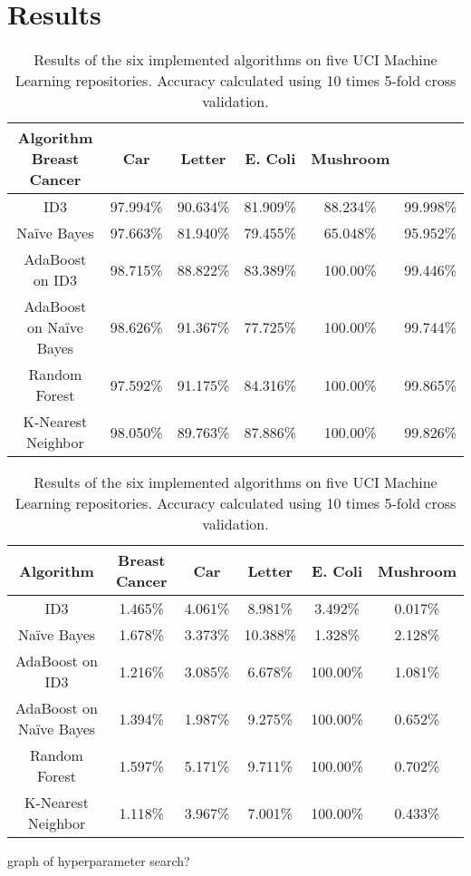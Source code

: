 \documentclass[11pt]{article}
\begin{document}
\section{Results}
\begin{table}
  \begin{tabular}{ |c|c|c|c|c|c| }
    \hline
    Algorithm               Breast Cancer   & Car      & Letter   & E. Coli  & Mushroom \\ \hline
    ID3                     & 97.994\%      & 90.634\% & 81.909\% & 88.234\% & 99.998\% \\ \hline
    Naïve Bayes             & 97.663\%      & 81.940\% & 79.455\% & 65.048\% & 95.952\% \\ \hline
    AdaBoost on ID3         & 98.715\%      & 88.822\% & 83.389\% & 100.00\% & 99.446\% \\ \hline
    AdaBoost on Naïve Bayes & 98.626\%      & 91.367\% & 77.725\% & 100.00\% & 99.744\% \\ \hline
    Random Forest           & 97.592\%      & 91.175\% & 84.316\% & 100.00\% & 99.865\% \\ \hline
    K-Nearest Neighbor      & 98.050\%      & 89.763\% & 87.886\% & 100.00\% & 99.826\% \\ \hline
  \end{tabular}
  \caption{Results of the six implemented algorithms on five UCI Machine Learning repositories. Accuracy calculated using 10 times 5-fold cross validation.}
\end{table}

\begin{table}
  \begin{tabular}{ |c|c|c|c|c|c| }
    \hline
    Algorithm               & Breast Cancer & Car      & Letter   & E. Coli  & Mushroom \\ \hline
    ID3                     & 1.465\%       & 4.061\%  & 8.981\%  & 3.492\% & 0.017\%  \\ \hline
    Naïve Bayes             & 1.678\%       & 3.373\%  & 10.388\% & 1.328\% & 2.128\%  \\ \hline
    AdaBoost on ID3         & 1.216\%       & 3.085\%  & 6.678\%  & 100.00\% & 1.081\%  \\ \hline
    AdaBoost on Naïve Bayes & 1.394\%       & 1.987\%  & 9.275\%  & 100.00\% & 0.652\%  \\ \hline
    Random Forest           & 1.597\%       & 5.171\%  & 9.711\%  & 100.00\% & 0.702\%  \\ \hline
    K-Nearest Neighbor      & 1.118\%       & 3.967\%  & 7.001\%  & 100.00\% & 0.433\%  \\ \hline
  \end{tabular}
  \caption{Results of the six implemented algorithms on five UCI Machine Learning repositories. Accuracy calculated using 10 times 5-fold cross validation.}
\end{table}

graph of hyperparameter search?



\end{document}
